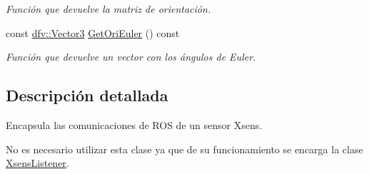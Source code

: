 \begin{DoxyCompactItemize}
\begin{DoxyCompactList}\small\item\em \-Función que devuelve la matriz de orientación. \end{DoxyCompactList}\item 
\hypertarget{classdfv_1_1SensorSubscriber_ac9ab6d72a5dfaffb4e810d2246fd8eff}{const \hyperlink{classdfv_1_1Vector3}{dfv\-::\-Vector3} \hyperlink{classdfv_1_1SensorSubscriber_ac9ab6d72a5dfaffb4e810d2246fd8eff}{\-Get\-Ori\-Euler} () const }\label{classdfv_1_1SensorSubscriber_ac9ab6d72a5dfaffb4e810d2246fd8eff}

\begin{DoxyCompactList}\small\item\em \-Función que devuelve un vector con los ángulos de \-Euler. \end{DoxyCompactList}\end{DoxyCompactItemize}


\subsection{\-Descripción detallada}
\-Encapsula las comunicaciones de \-R\-O\-S de un sensor \-Xsens. 

\-No es necesario utilizar esta clase ya que de su funcionamiento se encarga la clase \hyperlink{classdfv_1_1XsensListener}{\-Xsens\-Listener}. 

